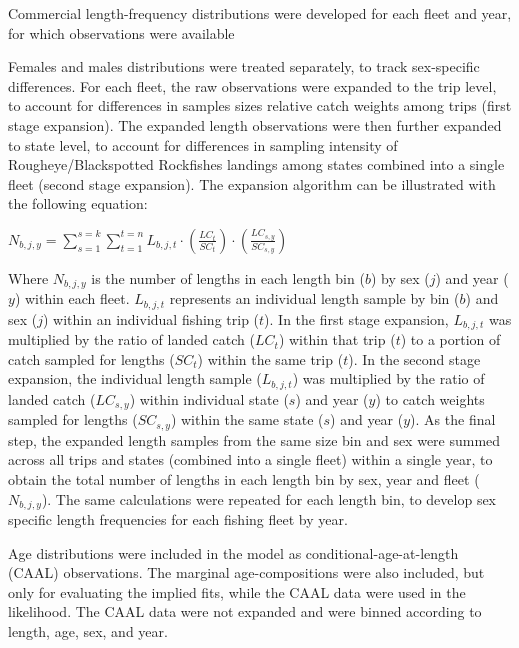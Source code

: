 \documentclass[
]{scrartcl}
\begin{document}
Commercial length-frequency distributions were developed for each fleet
and year, for which observations were available

Females and males distributions were treated separately, to track
sex-specific differences. For each fleet, the raw observations were
expanded to the trip level, to account for differences in samples sizes
relative catch weights among trips (first stage expansion). The expanded
length observations were then further expanded to state level, to
account for differences in sampling intensity of Rougheye/Blackspotted
Rockfishes landings among states combined into a single fleet (second
stage expansion). The expansion algorithm can be illustrated with the
following equation:

\begin{centering}

$N_{b,j,y} = \displaystyle\sum_{s=1}^{s=k}\displaystyle\sum_{t=1}^{t=n}L_{b,j,t} \cdot
\left(\frac{LC_t}{SC_t}\right) \cdot \left(\frac{LC_{s,y}}{SC_{s,y}}\right)$

\end{centering}

Where \(N_{b,j,y}\) is the number of lengths in each length bin (\(b\))
by sex (\(j\)) and year (\(y\)) within each fleet. \(L_{b,j,t}\)
represents an individual length sample by bin (\(b\)) and sex (\(j\))
within an individual fishing trip (\(t\)). In the first stage expansion,
\(L_{b,j,t}\) was multiplied by the ratio of landed catch (\(LC_t\))
within that trip (\(t\)) to a portion of catch sampled for lengths
(\(SC_t\)) within the same trip (\(t\)). In the second stage expansion,
the individual length sample (\(L_{b,j,t}\)) was multiplied by the ratio
of landed catch (\(LC_{s,y}\)) within individual state (\(s\)) and year
(\(y\)) to catch weights sampled for lengths (\(SC_{s,y}\)) within the
same state (\(s\)) and year (\(y\)). As the final step, the expanded
length samples from the same size bin and sex were summed across all
trips and states (combined into a single fleet) within a single year, to
obtain the total number of lengths in each length bin by sex, year and
fleet (\(N_{b,j,y}\)). The same calculations were repeated for each
length bin, to develop sex specific length frequencies for each fishing
fleet by year.

Age distributions were included in the model as
conditional-age-at-length (CAAL) observations. The marginal
age-compositions were also included, but only for evaluating the implied
fits, while the CAAL data were used in the likelihood. The CAAL data
were not expanded and were binned according to length, age, sex, and
year.
\end{document}
